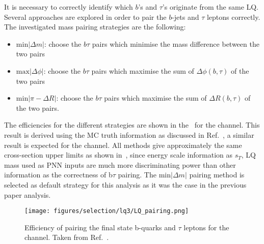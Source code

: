 It is necessary to correctly identify which $b$'s and $\tau$'s originate from the same LQ. Several approaches are explored in order to pair the $b$-jets 
and $\tau$ leptons correctly. The investigated mass pairing strategies are the following: 

\begin{itemize}
    \item $\mathrm{min}|\Delta m|$: choose the $b\tau$ pairs which minimise the mass difference between the two pairs
    \item $\mathrm{max}|\Delta \phi|$: choose the $b\tau$ pairs which maximise the sum of $\Delta\phi(b,\tau)$ of the two pairs
    \item $\mathrm{min}|\pi-\Delta R|$: choose the $b\tau$ pairs which maximise the sum of $\Delta R(b,\tau)$ of the two pairs.
\end{itemize}

The efficiencies for the different strategies are shown in the~ for the \lephad channel.
This result is derived using the MC truth information as discussed in Ref.~\cite{bib:lq_pairing}, a similar result is expected for the \hadhad channel.
All methods give approximately the same cross-section upper limits as shown in~,
since energy scale information as $s_T$, LQ mass used as PNN inputs are much more discriminating power than 
other information as the correctness of b$\tau$ pairing. The $\mathrm{min}|\Delta m|$ pairing method is selected as default strategy for 
this analysis as it was the case in the previous paper analysis.

\begin{figure}
  \centering
  \texttt{[image: figures/selection/lq3/LQ\_pairing.png]}
  \caption{Efficiency of pairing the final state b-quarks and $\tau$ leptons for the \lephad channel. Taken from Ref.~\cite{bib:lq_pairing}.}
  \label{fig:LQ_pairing}
\end{figure}
